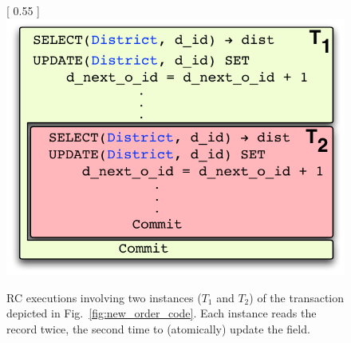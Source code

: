 \begin{figure}[!h]
\centering
{} [
  0.55\columnwidth
] {
  \includegraphics[scale=0.45]{Figures/motiv-eg-1-b}
}
  \caption{\small RC executions involving two instances ($T_1$ and
  $T_2$) of the  transaction depicted in
  Fig.~\ref{fig:new_order_code}. 
  Each instance reads the   record twice, the second
  time to (atomically) update the  field.}
\label{fig:new_order_execs}
\end{figure}

